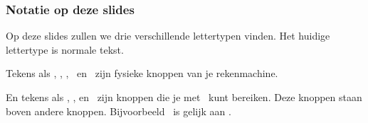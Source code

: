 \begin{frame}
\frametitle{Notatie op deze slides}

Op deze slides zullen we drie verschillende lettertypen vinden.
Het huidige lettertype is normale tekst.

\pause
{} 

\pause
Tekens als \tiPRGM, \tiGRAPH, \tiCOS,  \tiXTn\, en \tiENTER\, zijn fysieke knoppen van je rekenmachine.

\pause
En tekens als \tiLOne, \tiACOS, en \tiMATRIX\, zijn knoppen die je met \tiSecond\, kunt bereiken.
Deze knoppen staan boven andere knoppen. Bijvoorbeeld \tiTEST\, is gelijk aan \tiSecond\tiMATH.

\vspace{10 mm}
\end{frame}


